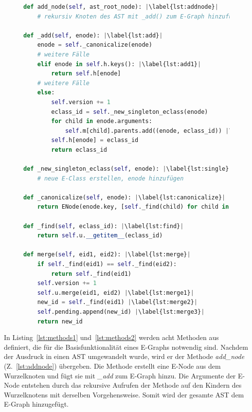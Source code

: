 \begin{figure}
\vspace{-7mm}
\hspace{3mm}
\begin{minipage}[t]{\linewidth}
\begin{lstlisting}[language=Python, escapechar=|, caption=Methoden der Klasse \textit{EGraph}, label={lst:methods1}]
def add_node(self, ast_root_node): |\label{lst:addnode}|
    # rekursiv Knoten des AST mit _add() zum E-Graph hinzufügen 

def _add(self, enode): |\label{lst:add}|
    enode = self._canonicalize(enode)
    # weitere Fälle 
    elif enode in self.h.keys(): |\label{lst:add1}|
        return self.h[enode]
    # weitere Fälle 
    else:
        self.version += 1
        eclass_id = self._new_singleton_eclass(enode)
        for child in enode.arguments:
            self.m[child].parents.add((enode, eclass_id)) |\label{lst:add2}|
        self.h[enode] = eclass_id
        return eclass_id

def _new_singleton_eclass(self, enode): |\label{lst:single}|
    # neue E-Class erstellen, enode hinzufügen
    
def _canonicalize(self, enode): |\label{lst:canonicalize}|
    return ENode(enode.key, [self._find(child) for child in enode.arguments])

def _find(self, eclass_id): |\label{lst:find}|
    return self.u.__getitem__(eclass_id)

def merge(self, eid1, eid2): |\label{lst:merge}|
    if self._find(eid1) == self._find(eid2):
        return self._find(eid1)
    self.version += 1
    self.u.merge(eid1, eid2) |\label{lst:merge1}|
    new_id = self._find(eid1) |\label{lst:merge2}|
    self.pending.append(new_id) |\label{lst:merge3}|
    return new_id
\end{lstlisting} 
\end{minipage}
\end{figure}

In Listing~\ref{lst:methods1} und~\ref{lst:methods2} werden acht Methoden aus~\cite{devito} definiert, die für die Basisfunktionalität eines E-Graphs notwendig sind.
Nachdem der Ausdruck in einen AST umgewandelt wurde, wird er der Methode \textit{add\_node} (Z.~\ref{lst:addnode}) übergeben. Die Methode erstellt eine E-Node aus dem Wurzelknoten
und fügt sie mit \textit{\_add} zum E-Graph hinzu. Die Argumente der E-Node entstehen durch das rekursive Aufrufen der Methode auf den Kindern des Wurzelknotens mit derselben Vorgehensweise.
Somit wird der gesamte AST dem E-Graph hinzugefügt.

